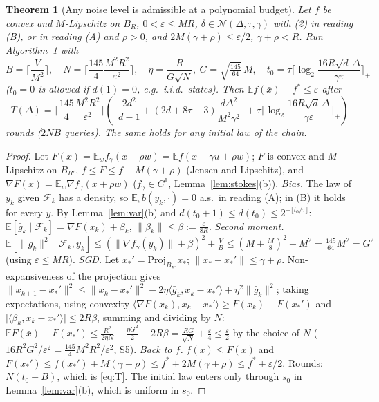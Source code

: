 \documentclass[11pt,a4paper]{article}
\numberwithin{equation}{section}
\newtheorem{theorem}{Theorem}[section]
\theoremstyle{definition}
\theoremstyle{remark}
\newcommand{\E}{\mathbb E}\newcommand{\R}{\mathbb R}\newcommand{\N}{\mathbb N}\newcommand{\Prob}{\mathbb P}
\newcommand{\norm}[1]{\lVert #1\rVert}\newcommand{\abs}[1]{\lvert #1\rvert}\newcommand{\ip}[2]{\langle #1,#2\rangle}
\newcommand{\cN}{\mathcal N}\newcommand{\cG}{\mathcal G}\newcommand{\cF}{\mathcal F}\newcommand{\cS}{\mathcal S}
\begin{document}
\begin{theorem}[Any noise level is admissible at a polynomial budget]\label{thm:alg}
Let $f$ be convex and $M$-Lipschitz on $B_R$, $0<\varepsilon\le MR$, $\delta\in\cN(\Delta,\tau,\gamma)$ with (2) in reading (B), or in reading (A) and $\rho>0$, and $2M(\gamma+\rho)\le\varepsilon/2$, $\gamma+\rho<R$. Run Algorithm~1 with
\[
B=\Big\lceil\frac V{M^2}\Big\rceil,\quad N=\Big\lceil\frac{145}{4}\frac{M^2R^2}{\varepsilon^2}\Big\rceil,\quad \eta=\frac R{G\sqrt N},\ G=\sqrt{\tfrac{145}{64}}\,M,\quad
t_0=\tau\Big\lceil\log_2\frac{16R\sqrt d\,\Delta}{\gamma\varepsilon}\Big\rceil_+
\]
($t_0=0$ is allowed if $d(1)=0$, e.g.\ i.i.d.\ states). Then $\E f(\bar x)-f^*\le\varepsilon$ after
\begin{equation}\label{eq:T}
T(\Delta)=\Big\lceil\frac{145}{4}\frac{M^2R^2}{\varepsilon^2}\Big\rceil\left(\Big\lceil\frac{2d^2}{d-1}+(2d+8\tau-3)\frac{d\Delta^2}{M^2\gamma^2}\Big\rceil+\tau\Big\lceil\log_2\frac{16R\sqrt d\,\Delta}{\gamma\varepsilon}\Big\rceil_+\right)
\end{equation}
rounds ($2NB$ queries). The same holds for any initial law of the chain.
\end{theorem}
\begin{proof}
Let $F(x)=\E_wf_\gamma(x+\rho w)=\E f(x+\gamma u+\rho w)$; $F$ is convex and $M$-Lipschitz on $B_{R'}$, $f\le F\le f+M(\gamma+\rho)$ (Jensen and Lipschitz), and $\nabla F(x)=\E_w\nabla f_\gamma(x+\rho w)$ ($f_\gamma\in C^1$, Lemma~\ref{lem:stokes}(b)).
\emph{Bias.} The law of $y_k$ given $\mathcal F_k$ has a density, so $\E_\pi b(y_k,\cdot)=0$ a.s.\ in reading (A); in (B) it holds for every $y$. By Lemma~\ref{lem:var}(b) and $d(t_0+1)\le d(t_0)\le2^{-\lfloor t_0/\tau\rfloor}$: $\E[\bar g_k\mid\mathcal F_k]=\nabla F(x_k)+\beta_k$, $\norm{\beta_k}\le\beta:=\frac{\varepsilon}{8R}$.
\emph{Second moment.} $\E[\norm{\bar g_k}^2\mid\mathcal F_k,y_k]\le(\norm{\nabla f_\gamma(y_k)}+\beta)^2+\frac VB\le(M+\tfrac M8)^2+M^2=\tfrac{145}{64}M^2=G^2$ (using $\varepsilon\le MR$).
\emph{SGD.} Let $x_*'=\mathrm{Proj}_{B_{R'}}x_*$; $\norm{x_*-x_*'}\le\gamma+\rho$. Non-expansiveness of the projection gives
$\norm{x_{k+1}-x_*'}^2\le\norm{x_k-x_*'}^2-2\eta\ip{\bar g_k}{x_k-x_*'}+\eta^2\norm{\bar g_k}^2$; taking expectations, using convexity $\ip{\nabla F(x_k)}{x_k-x_*'}\ge F(x_k)-F(x_*')$ and $\abs{\ip{\beta_k}{x_k-x_*'}}\le2R\beta$, summing and dividing by $N$:
$\E F(\bar x)-F(x_*')\le\frac{R^2}{2\eta N}+\frac{\eta G^2}2+2R\beta=\frac{RG}{\sqrt N}+\frac\varepsilon4\le\frac\varepsilon2$ by the choice of $N$ ($16R^2G^2/\varepsilon^2=\frac{145}4M^2R^2/\varepsilon^2$, S5).
\emph{Back to $f$.} $f(\bar x)\le F(\bar x)$ and $F(x_*')\le f(x_*')+M(\gamma+\rho)\le f^*+2M(\gamma+\rho)\le f^*+\varepsilon/2$.
Rounds: $N(t_0+B)$, which is \eqref{eq:T}. The initial law enters only through $s_0$ in Lemma~\ref{lem:var}(b), which is uniform in $s_0$.
\end{proof}
\end{document}
